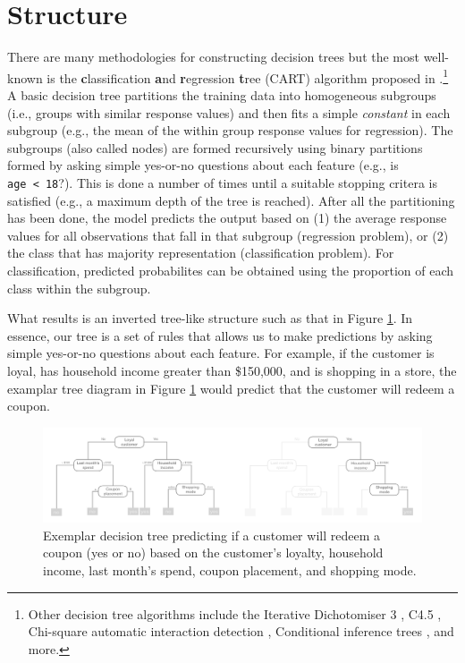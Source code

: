 \documentclass[]{krantz}
\begin{document}
\hypertarget{structure}{%
\section{Structure}\label{structure}}

There are many methodologies for constructing decision trees but the most well-known is the \textbf{c}lassification \textbf{a}nd \textbf{r}egression \textbf{t}ree (CART) algorithm proposed in \citet{breiman2017classification}.\footnote{Other decision tree algorithms include the Iterative Dichotomiser 3 \citep{quinlan1986induction}, C4.5 \citep{quinlan1996bagging}, Chi-square automatic interaction detection \citep{kass1980exploratory}, Conditional inference trees \citep{hothorn2006unbiased}, and more.} A basic decision tree partitions the training data into homogeneous subgroups (i.e., groups with similar response values) and then fits a simple \emph{constant} in each subgroup (e.g., the mean of the within group response values for regression). The subgroups (also called nodes) are formed recursively using binary partitions formed by asking simple yes-or-no questions about each feature (e.g., is \texttt{age\ \textless{}\ 18}?). This is done a number of times until a suitable stopping critera is satisfied (e.g., a maximum depth of the tree is reached). After all the partitioning has been done, the model predicts the output based on (1) the average response values for all observations that fall in that subgroup (regression problem), or (2) the class that has majority representation (classification problem). For classification, predicted probabilites can be obtained using the proportion of each class within the subgroup.

What results is an inverted tree-like structure such as that in Figure \ref{fig:exemplar-decision-tree}. In essence, our tree is a set of rules that allows us to make predictions by asking simple yes-or-no questions about each feature. For example, if the customer is loyal, has household income greater than \$150,000, and is shopping in a store, the examplar tree diagram in Figure \ref{fig:exemplar-decision-tree} would predict that the customer will redeem a coupon.

\begin{figure}

{\centering \includegraphics[width=1\linewidth,height=1\textheight]{images/exemplar-decision-tree} 

}

\caption{Exemplar decision tree predicting if a customer will redeem a coupon (yes or no) based on the customer's loyalty, household income, last month's spend, coupon placement, and shopping mode.}\label{fig:exemplar-decision-tree}
\end{figure}
\end{document}
